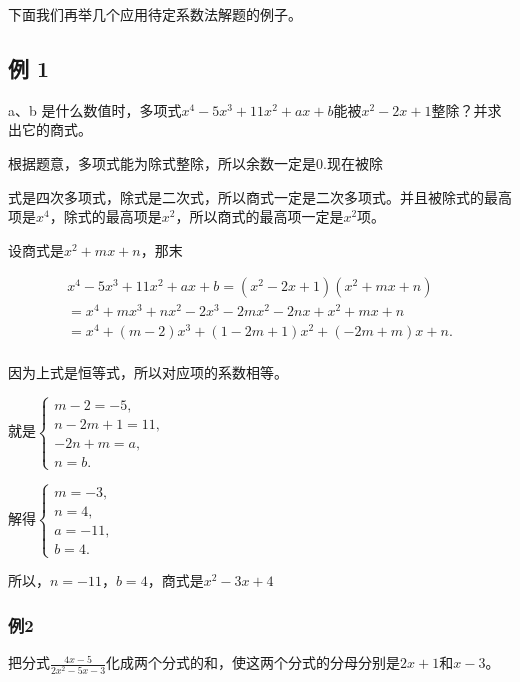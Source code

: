 下面我们再举几个应用待定系数法解题的例子。

\subsection{例 1}

a、b
是什么数值时，多项式\(x^{4}-5x^{3}+11x^{2}+ax+b\)能被\(x^{2}-2x+1\)整除？并求出它的商式。

 根据题意，多项式能为除式整除，所以余数一定是0.现在被除

式是四次多项式，除式是二次式，所以商式一定是二次多项式。并且被除式的最高项是\(x^{4}\)，除式的最高项是\(x^{2}\)，所以商式的最高项一定是\(x^{2}\)项。

 设商式是\(x^{2} + mx + n\)，那末

\[
\begin{array}{l} x ^ {4} - 5 x ^ {3} + 11 x ^ {2} + a x + b = (x ^ {2} - 2 x + 1) (x ^ {2} + m x + n) \\ = x ^ {4} + m x ^ {3} + n x ^ {2} - 2 x ^ {3} - 2 m x ^ {2} - 2 n x + x ^ {2} + m x + n \\ = x ^ {4} + (m - 2) x ^ {3} + (1 - 2 m + 1) x ^ {2} + (- 2 m + m) x + n. \\ \end{array}
\]

因为上式是恒等式，所以对应项的系数相等。

就是\(\left\{ \begin{array}{l} m - 2 = -5, \\ n - 2m + 1 = 11, \\ -2n + m = a, \\ n = b. \end{array} \right.\)

解得\(\left\{ \begin{array}{l} m = -3, \\ n = 4, \\ a = -11, \\ b = 4. \end{array} \right.\)

所以，\(n = -11\)，\(b = 4\)，商式是\(x^{2} - 3x + 4\)

\subsubsection{例2}

把分式\(\frac{4x - 5}{2x^2 - 5x - 3}\)化成两个分式的和，使这两个分式的分母分别是\(2x + 1\)和\(x - 3\)。

